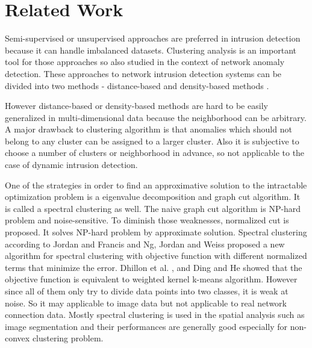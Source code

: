 \section{Related Work}
Semi-supervised or unsupervised approaches are preferred in intrusion detection \cite{chandola09} because it can handle imbalanced datasets.
Clustering analysis is an important tool for those approaches so also studied in the context of network anomaly detection. 
These approaches to network intrusion detection systems can be divided into two methods - distance-based \cite{knorr00}\cite{ramaswamy00} and density-based methods \cite{breuning00}\cite{aggarwal01}. 

However distance-based or density-based methods are hard to be easily generalized in multi-dimensional data because the neighborhood can be arbitrary. 
A major drawback to clustering algorithm is that anomalies which should not belong to any cluster can be assigned to a larger cluster. 
Also it is subjective to choose a number of clusters or neighborhood in advance, so not applicable to the case of dynamic intrusion detection. 

One of the strategies in order to find an approximative solution to the intractable optimization problem is a eigenvalue decomposition and graph cut algorithm. 
It is called a spectral clustering as well. 
The naive graph cut algorithm is NP-hard problem and noise-sensitive. 
To diminish those weaknesses, normalized cut \cite{jianbo00} is proposed. 
It solves NP-hard problem by approximate solution.
Spectral clustering according to Jordan and Francis \cite{jordan04} and Ng, Jordan and Weiss \cite{ng01} proposed a new algorithm for spectral clustering with objective function with different normalized terms that minimize the error.
Dhillon et al. \cite{dhillon04}, and Ding and He \cite{cding04} showed that the objective function is equivalent to weighted kernel k-means algorithm.
However since all of them only try to divide data points into two classes, it is weak at noise.
So it may applicable to image data but not applicable to real network connection data. 
Mostly spectral clustering is used in the spatial analysis such as image segmentation and their performances are generally good especially for non-convex clustering problem. 

